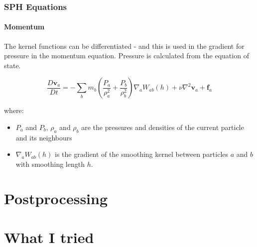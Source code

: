 \documentclass[notheorems, aspectratio=169]{beamer}
\begin{document}
    \begin{frame}[fragile]
      \frametitle{SPH Equations}
      \framesubtitle{Momentum}
      
      The kernel functions can be differentiated - and this is used in the gradient for pressure in the momentum equation. Pressure is calculated from the equation of state. 
      
      \begin{equation*}
      \frac{D\mathbf{v}_a}{Dt} = -\sum_b m_b \left( \frac{P_a}{\rho_a^2} + \frac{P_b}{\rho_b^2} \right) \nabla_a W_{ab}(h)
      + \nu \nabla^2 \mathbf{v}_a + \mathbf{f}_a
      \end{equation*}
      
      where:
      \begin{itemize}

        \item \( P_a \) and \( P_b \), \( \rho_a \) and \( \rho_b \) are the pressures and densities of the current particle and its neighbours 
        \item \( \nabla_a W_{ab}(h) \) is the gradient of the smoothing kernel between particles \( a \) and \( b \) with smoothing length \( h \).
      \end{itemize}
      
      \end{frame}

      
      \section{Postprocessing} 
      \frame{\tableofcontents[currentsection]}

  \section{What I tried} 
  \frame{\tableofcontents[currentsection]}
      
\end{document}

